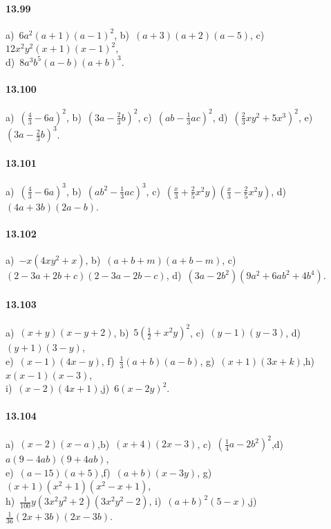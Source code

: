\paragraph{13.99} a)~$6a^{2}(a+1)(a-1)^{2}$,\quad
b)~$(a+3)(a+2)(a-5)$,\quad
c)~$12x^{2}y^{2}(x+1)(x-1)^{2}$,\protect\\
d)~$8a^{3}b^{5}(a-b)(a+b)^{3}$.

\paragraph{13.100} a)~$\left(\frac{4}{3}-6a\right)^{2}$,\quad
b)~$\left(3a-\frac{2}{3}b\right)^{2}$,\quad
c)~$\left(ab-\frac{1}{3}ac\right)^{2}$,\quad
d)~$\left(\frac{2}{3}xy^{2}+5x^{3}\right)^{2}$,\quad
e)~$\left(3a-\frac{2}{3}b\right)^{3}$.

\paragraph{13.101} a)~$\left(\frac{4}{3}-6a\right)^{3}$,\quad
b)~$\left(ab^{2}-\frac{1}{3}ac\right)^{3}$,\quad
c)~$\left(\frac{x}{3}+\frac{2}{5}x^{2}y\right)\left(\frac{x}{3}-\frac{2}{5}x^{2}y\right)$,\quad
d)~$(4a+3b)(2a-b)$.

\paragraph{13.102} a)~$-x\left(4xy^{2}+x\right)$,\quad
b)~$(a+b+m)(a+b-m)$,\quad
c)~$(2-3a+2b+c)(2-3a-2b-c)$,\quad
d)~$\left(3a-2b^{2}\right)\left(9a^{2}+6ab^{2}+4b^{4}\right)$.

\paragraph{13.103} a)~$(x+y)\left(x-y+2\right)$,\quad
b)~$5\left(\frac{1}{2}+x^{2}y\right)^{2}$,\quad
c)~$(y-1)\left(y-3\right)$,\quad
d)~$(y+1)\left(3-y\right)$,\protect\\
e)~$(x-1)\left(4x-y\right)$,\quad
f)~$\frac{1}{3}(a+b)\left(a-b\right)$,\quad
g)~$(x+1)\left(3x+k\right)$,\quad h)~$x(x-1)\left(x-3\right)$,\protect\\
i)~$(x-2)\left(4x+1\right)$,\quad j)~$6\left(x-2y\right)^{2}$.

\paragraph{13.104} a)~$(x-2)\left(x-a\right)$,\quad b)~$(x+4)\left(2x-3\right)$,\quad
c)~$\left(\frac{1}{4}a-2b^{2}\right)^{2}$,\quad d)~$a(9-4{ab})(9+4{ab})$,\quad \protect\\
e)~$(a-15)(a+5)$,\quad f)~$(a+b)(x-3y)$,\quad
g)~$(x+1)\left(x^{2}+1\right)\left(x^{2}-x+1\right)$,\protect\\
h)~$\frac{1}{100}y\left(3x^{2}y^{2}+2\right)\left(3x^{2}y^{2}-2\right)$,\quad
i)~$(a+b)^{2}\left(5-x\right)$,\quad j)~$\frac{1}{36}(2x+3b)\left(2x-3b\right)$.

